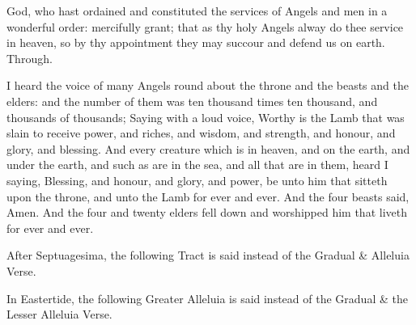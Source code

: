  God, who hast ordained and constituted the services of Angels and men in a wonderful order: mercifully grant; that as thy holy Angels alway do thee service in heaven, so by thy appointment they may succour and defend us on earth. Through.

 I heard the voice of many Angels round about the throne and the beasts and the elders: and the number of them was ten thousand times ten thousand, and thousands of thousands; Saying with a loud voice, Worthy is the Lamb that was slain to receive power, and riches, and wisdom, and strength, and honour, and glory, and blessing. And every creature which is in heaven, and on the earth, and under the earth, and such as are in the sea, and all that are in them, heard I saying, Blessing, and honour, and glory, and power, be unto him that sitteth upon the throne, and unto the Lamb for ever and ever. And the four beasts said, Amen. And the four and twenty elders fell down and worshipped him that liveth for ever and ever.


\begin{rubric}
    After Septuagesima, the following Tract is said instead of the Gradual \& Alleluia Verse.
\end{rubric}


\begin{rubric}
    In Eastertide, the following Greater Alleluia is said instead of the Gradual \& the Lesser Alleluia Verse.
\end{rubric}


